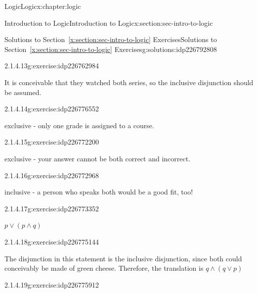 \documentclass[twoside,10pt,]{book}
\newcommand{\xreffont}{\relax}
\numberwithin{equation}{section}
\begin{document}
\begin{chapterptx}{Logic}{}{Logic}{}{}{x:chapter:logic}
\begin{sectionptx}{Introduction to Logic}{}{Introduction to Logic}{}{}{x:section:sec-intro-to-logic}
\begin{solutions-subsection}{Solutions to Section~{\xreffont\ref*{x:section:sec-intro-to-logic}} Exercises}{}{Solutions to Section~{\xreffont\ref*{x:section:sec-intro-to-logic}} Exercises}{}{}{g:solutions:idp226792808}
\begin{exercisegroup}
\begin{divisionsolutioneg}{2.1.4.13}{}{g:exercise:idp226762984}
\par\smallskip%
\noindent\hypertarget{g:solution:idp226774632-main}{}It is conceivable that they watched both series, so the inclusive disjunction should be assumed.\end{divisionsolutioneg}%
\begin{divisionsolutioneg}{2.1.4.14}{}{g:exercise:idp226776552}%
\par\smallskip%
\noindent\hypertarget{g:solution:idp226772072-main}{}exclusive - only one grade is assigned to a course.\end{divisionsolutioneg}%
\begin{divisionsolutioneg}{2.1.4.15}{}{g:exercise:idp226772200}%
\par\smallskip%
\noindent\hypertarget{g:solution:idp226770664-main}{}exclusive - your answer cannot be both correct and incorrect.\end{divisionsolutioneg}%
\begin{divisionsolutioneg}{2.1.4.16}{}{g:exercise:idp226772968}%
\par\smallskip%
\noindent\hypertarget{g:solution:idp226772712-main}{}inclusive - a person who speaks both would be a good fit, too!\end{divisionsolutioneg}%
\end{exercisegroup}
\par\medskip\noindent
\begin{exercisegroup}
\begin{divisionsolutioneg}{2.1.4.17}{}{g:exercise:idp226773352}%
\par\smallskip%
\noindent\hypertarget{g:solution:idp226771432-main}{}\(p{\vee}(p{\wedge} q)\)\end{divisionsolutioneg}%
\begin{divisionsolutioneg}{2.1.4.18}{}{g:exercise:idp226775144}%
\par\smallskip%
\noindent\hypertarget{g:solution:idp226773992-main}{}The disjunction in this statement is the inclusive disjunction, since both could conceivably be made of green cheese.  Therefore, the translation is \(q{\wedge}(q{\vee} p)\)\end{divisionsolutioneg}%
\begin{divisionsolutioneg}{2.1.4.19}{}{g:exercise:idp226775912}%
\par\smallskip%

\end{divisionsolutioneg}
\end{exercisegroup}
\end{solutions-subsection}
\end{sectionptx}
\end{chapterptx}
\end{document}
